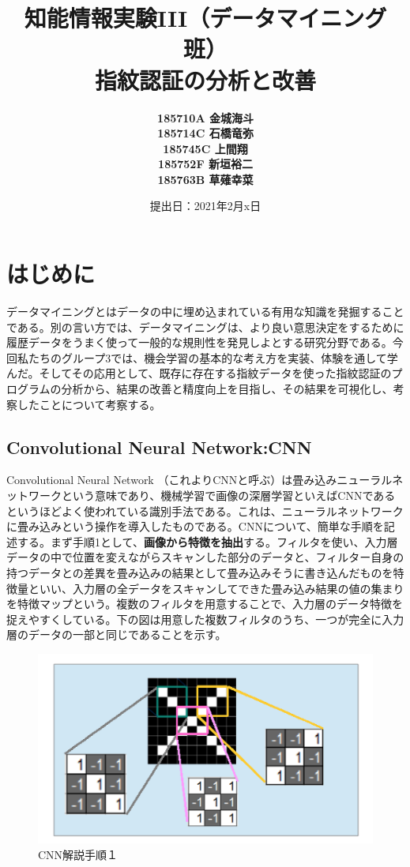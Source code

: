 \documentclass[a4paper, 11pt, titlepage]{jsarticle}
\title{知能情報実験III（データマイニング班）\\指紋認証の分析と改善}
\author{\textbf{185710A 金城海斗}\\
\textbf{185714C 石橋竜弥}\\
 \textbf{185745C 上間翔}\\
 \textbf{185752F 新垣裕二}\\
 \textbf{185763B 草薙幸菜}}
\date{提出日：2021年2月x日}
\begin{document}
\maketitle
\tableofcontents
\clearpage


\section{はじめに}
データマイニングとはデータの中に埋め込まれている有用な知識を発掘することである。別の言い方では、データマイニングは、より良い意思決定をするために履歴データをうまく使って一般的な規則性を発見しよとする研究分野である。今回私たちのグループ3では、機会学習の基本的な考え方を実装、体験を通して学んだ。そしてその応用として、既存に存在する指紋データを使った指紋認証のプログラムの分析から、結果の改善と精度向上を目指し、その結果を可視化し、考察したことについて考察する。

\subsection{Convolutional Neural Network:CNN}
Convolutional Neural Network （これよりCNNと呼ぶ）は畳み込みニューラルネットワークという意味であり、機械学習で画像の深層学習といえばCNNであるというほどよく使われている識別手法である。これは、ニューラルネットワークに畳み込みという操作を導入したものである。CNNについて、簡単な手順を記述する。まず手順1として、\textbf{画像から特徴を抽出}する。フィルタを使い、入力層データの中で位置を変えながらスキャンした部分のデータと、フィルター自身の持つデータとの差異を畳み込みの結果として畳み込みそうに書き込んだものを特徴量といい、入力層の全データをスキャンしてできた畳み込み結果の値の集まりを特徴マップという。複数のフィルタを用意することで、入力層のデータ特徴を捉えやすくしている。下の図は用意した複数フィルタのうち、一つが完全に入力層のデータの一部と同じであることを示す。

\begin{figure}[h]
  \centering
  \includegraphics[scale=0.4]{cnn1.png}
  \caption{CNN解説手順１}
  \label{cnn}
\end{figure}
\end{document}
